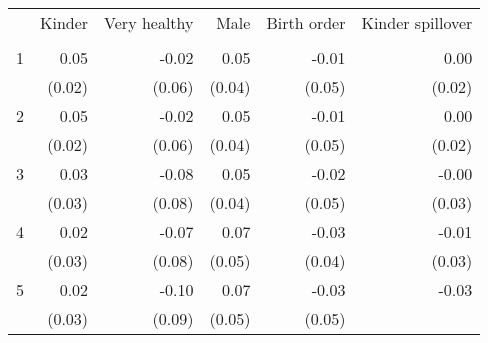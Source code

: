 \begin{tabular}{llllll}
\cline{1-6}
\multicolumn{1}{c}{} &
  \multicolumn{1}{|r}{Kinder} &
  \multicolumn{1}{r}{Very healthy} &
  \multicolumn{1}{r}{Male} &
  \multicolumn{1}{r}{Birth order} &
  \multicolumn{1}{r}{Kinder spillover} \\
\multicolumn{1}{c}{} &
  \multicolumn{1}{|r}{} &
  \multicolumn{1}{r}{} &
  \multicolumn{1}{r}{} &
  \multicolumn{1}{r}{} &
  \multicolumn{1}{r}{} \\
\cline{1-6}
\multicolumn{1}{l}{1} &
  \multicolumn{1}{|r}{0.05} &
  \multicolumn{1}{r}{-0.02} &
  \multicolumn{1}{r}{0.05} &
  \multicolumn{1}{r}{-0.01} &
  \multicolumn{1}{r}{0.00} \\
\multicolumn{1}{l}{} &
  \multicolumn{1}{|r}{(0.02)} &
  \multicolumn{1}{r}{(0.06)} &
  \multicolumn{1}{r}{(0.04)} &
  \multicolumn{1}{r}{(0.05)} &
  \multicolumn{1}{r}{(0.02)} \\
\multicolumn{1}{l}{2} &
  \multicolumn{1}{|r}{0.05} &
  \multicolumn{1}{r}{-0.02} &
  \multicolumn{1}{r}{0.05} &
  \multicolumn{1}{r}{-0.01} &
  \multicolumn{1}{r}{0.00} \\
\multicolumn{1}{l}{} &
  \multicolumn{1}{|r}{(0.02)} &
  \multicolumn{1}{r}{(0.06)} &
  \multicolumn{1}{r}{(0.04)} &
  \multicolumn{1}{r}{(0.05)} &
  \multicolumn{1}{r}{(0.02)} \\
\multicolumn{1}{l}{3} &
  \multicolumn{1}{|r}{0.03} &
  \multicolumn{1}{r}{-0.08} &
  \multicolumn{1}{r}{0.05} &
  \multicolumn{1}{r}{-0.02} &
  \multicolumn{1}{r}{-0.00} \\
\multicolumn{1}{l}{} &
  \multicolumn{1}{|r}{(0.03)} &
  \multicolumn{1}{r}{(0.08)} &
  \multicolumn{1}{r}{(0.04)} &
  \multicolumn{1}{r}{(0.05)} &
  \multicolumn{1}{r}{(0.03)} \\
\multicolumn{1}{l}{4} &
  \multicolumn{1}{|r}{0.02} &
  \multicolumn{1}{r}{-0.07} &
  \multicolumn{1}{r}{0.07} &
  \multicolumn{1}{r}{-0.03} &
  \multicolumn{1}{r}{-0.01} \\
\multicolumn{1}{l}{} &
  \multicolumn{1}{|r}{(0.03)} &
  \multicolumn{1}{r}{(0.08)} &
  \multicolumn{1}{r}{(0.05)} &
  \multicolumn{1}{r}{(0.04)} &
  \multicolumn{1}{r}{(0.03)} \\
\multicolumn{1}{l}{5} &
  \multicolumn{1}{|r}{0.02} &
  \multicolumn{1}{r}{-0.10} &
  \multicolumn{1}{r}{0.07} &
  \multicolumn{1}{r}{-0.03} &
  \multicolumn{1}{r}{-0.03} \\
\multicolumn{1}{l}{} &
  \multicolumn{1}{|r}{(0.03)} &
  \multicolumn{1}{r}{(0.09)} &
  \multicolumn{1}{r}{(0.05)} &
  \multicolumn{1}{r}{(0.05)} &

\end{tabular}
